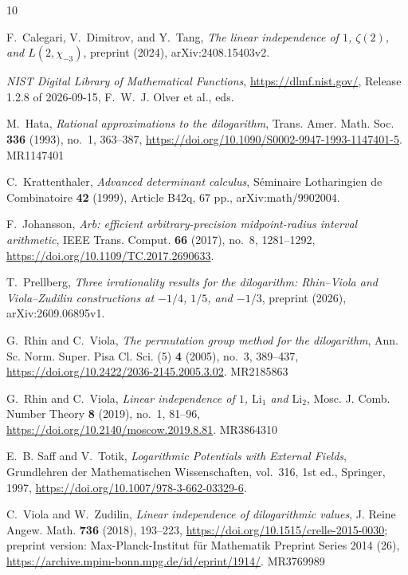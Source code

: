 \documentclass{amsart}
\numberwithin{equation}{section}
\numberwithin{table}{section}
\begin{document}
\begin{thebibliography}{10}

F.~Calegari, V.~Dimitrov, and Y.~Tang, \emph{The linear independence of $1$,
$\zeta(2)$, and $L(2,\chi_{-3})$}, preprint (2024), arXiv:2408.15403v2.

\emph{NIST Digital Library of Mathematical Functions},
\url{https://dlmf.nist.gov/}, Release 1.2.8 of 2026-09-15, F.~W.~J. Olver
et al., eds.

M.~Hata, \emph{Rational approximations to the dilogarithm}, Trans. Amer. Math.
Soc. \textbf{336} (1993), no.~1, 363--387,
\url{https://doi.org/10.1090/S0002-9947-1993-1147401-5}. MR1147401

C.~Krattenthaler, \emph{Advanced determinant calculus}, S\'eminaire Lotharingien
de Combinatoire \textbf{42} (1999), Article B42q, 67 pp., arXiv:math/9902004.

F.~Johansson, \emph{Arb: efficient arbitrary-precision midpoint-radius
interval arithmetic}, IEEE Trans. Comput. \textbf{66} (2017), no.~8,
1281--1292, \url{https://doi.org/10.1109/TC.2017.2690633}.

T.~Prellberg, \emph{Three irrationality results for the dilogarithm:
Rhin--Viola and Viola--Zudilin constructions at $-1/4$, $1/5$, and $-1/3$},
preprint (2026), arXiv:2609.06895v1.

G.~Rhin and C.~Viola, \emph{The permutation group method for the dilogarithm},
Ann. Sc. Norm. Super. Pisa Cl. Sci. (5) \textbf{4} (2005), no.~3, 389--437,
\url{https://doi.org/10.2422/2036-2145.2005.3.02}. MR2185863

G.~Rhin and C.~Viola, \emph{Linear independence of $1$, $\mathrm{Li}_1$ and
$\mathrm{Li}_2$}, Mosc. J. Comb. Number Theory \textbf{8} (2019), no.~1,
81--96,
\url{https://doi.org/10.2140/moscow.2019.8.81}. MR3864310

E.~B. Saff and V.~Totik, \emph{Logarithmic Potentials with External Fields},
Grundlehren der Mathematischen Wissenschaften, vol.~316, 1st ed., Springer, 1997,
\url{https://doi.org/10.1007/978-3-662-03329-6}.

C.~Viola and W.~Zudilin, \emph{Linear independence of dilogarithmic values},
J. Reine Angew. Math. \textbf{736} (2018), 193--223,
\url{https://doi.org/10.1515/crelle-2015-0030}; preprint version:
Max-Planck-Institut f\"ur Mathematik Preprint Series 2014 (26),
\url{https://archive.mpim-bonn.mpg.de/id/eprint/1914/}. MR3769989

\end{thebibliography}
\end{document}
